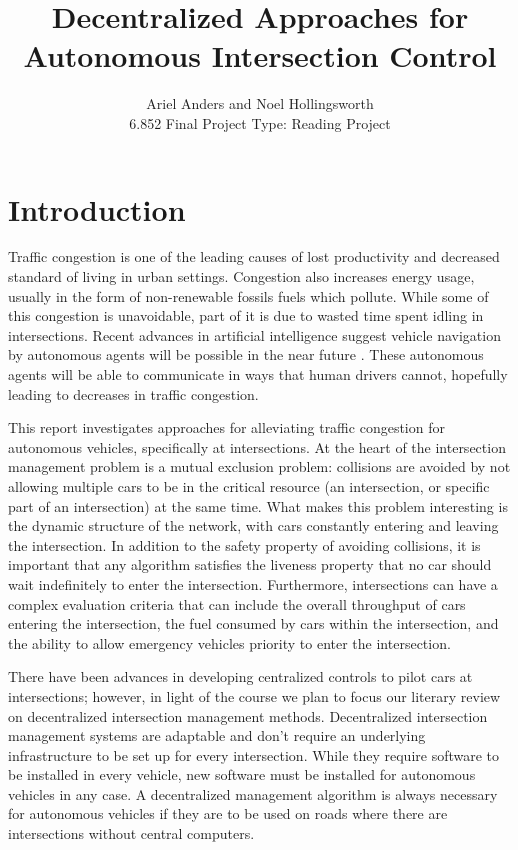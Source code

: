 \documentclass[12pt]{article}
\title{Decentralized Approaches for Autonomous Intersection Control }
\author{Ariel Anders and Noel Hollingsworth\\ 6.852 Final Project Type: Reading Project}
\begin{document}
\maketitle 

\pagebreak
\tableofcontents
\pagebreak

\section{Introduction}

Traffic congestion is one of the leading causes of lost productivity and decreased standard of living in urban settings. Congestion also increases energy usage, usually in the form of non-renewable fossils fuels which pollute. While some of this congestion is unavoidable, part of it is due to wasted time spent idling in intersections. Recent advances in artificial intelligence suggest vehicle navigation by autonomous agents will be possible in the near future \cite{dresner}. These autonomous agents will be able to communicate in ways that human drivers cannot, hopefully leading to decreases in traffic congestion.

This report investigates approaches for alleviating traffic congestion for autonomous vehicles, specifically at intersections. At the heart of the intersection management problem is a mutual exclusion problem: collisions are avoided by not allowing multiple cars to be in the critical resource (an intersection, or specific part of an intersection) at the same time.  What makes this problem interesting is the dynamic structure of the network, with cars constantly entering and leaving the intersection.  In addition to the safety property of avoiding collisions, it is important that any algorithm satisfies the liveness property that no car should wait indefinitely to enter the intersection.  Furthermore, intersections can have a complex evaluation criteria that can include the overall throughput of cars entering the intersection, the fuel consumed by cars within the intersection, and the ability to allow emergency vehicles priority to enter the intersection. 

There have been advances in developing centralized controls to pilot cars at intersections; however, in light of the course we plan to focus our literary review on decentralized intersection management methods.  Decentralized intersection management systems are adaptable and don't require an underlying infrastructure to be set up for every intersection. While they require software to be installed in every vehicle, new software must be installed for autonomous vehicles in any case. A decentralized management algorithm is always necessary for autonomous vehicles if they are to be used on roads where there are intersections without central computers.
\end{document}
